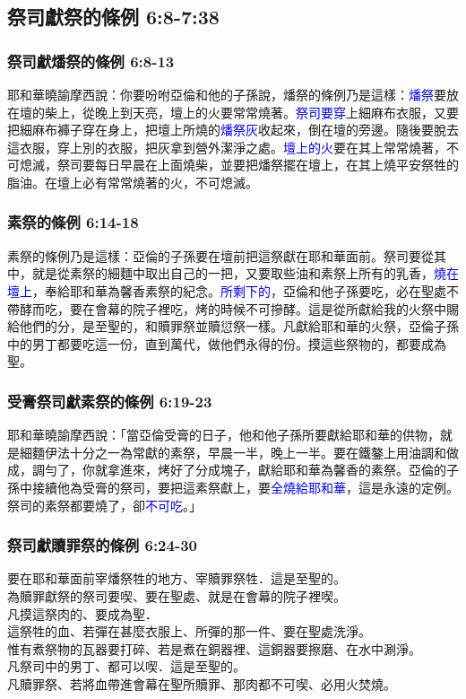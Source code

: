 \subsection{祭司獻祭的條例 6:8-7:38}
\subsubsection{祭司獻燔祭的條例 6:8-13}
\noindent
耶和華曉諭摩西說：你要吩咐亞倫和他的子孫說，燔祭的條例乃是這樣：\textcolor{blue}{燔祭}要放在壇的柴上，從晚上到天亮，壇上的火要常常燒著。\textcolor{blue}{祭司要穿}上細麻布衣服，又要把細麻布褲子穿在身上，把壇上所燒的\textcolor{blue}{燔祭灰}收起來，倒在壇的旁邊。隨後要脫去這衣服，穿上別的衣服，把灰拿到營外潔淨之處。\textcolor{blue}{壇上的火}要在其上常常燒著，不可熄滅，祭司要每日早晨在上面燒柴，並要把燔祭擺在壇上，在其上燒平安祭牲的脂油。在壇上必有常常燒著的火，不可熄滅。

\subsubsection{素祭的條例 6:14-18}
素祭的條例乃是這樣：亞倫的子孫要在壇前把這祭獻在耶和華面前。祭司要從其中，就是從素祭的細麵中取出自己的一把，又要取些油和素祭上所有的乳香，\textcolor{blue}{燒在壇上}，奉給耶和華為馨香素祭的紀念。\textcolor{blue}{所剩下的}，亞倫和他子孫要吃，必在聖處不帶酵而吃，要在會幕的院子裡吃，烤的時候不可摻酵。這是從所獻給我的火祭中賜給他們的分，是至聖的，和贖罪祭並贖愆祭一樣。凡獻給耶和華的火祭，亞倫子孫中的男丁都要吃這一份，直到萬代，做他們永得的份。摸這些祭物的，都要成為聖。

\subsubsection{受膏祭司獻素祭的條例 6:19-23}
耶和華曉諭摩西說：「當亞倫受膏的日子，他和他子孫所要獻給耶和華的供物，就是細麵伊法十分之一為常獻的素祭，早晨一半，晚上一半。要在鐵鏊上用油調和做成，調勻了，你就拿進來，烤好了分成塊子，獻給耶和華為馨香的素祭。亞倫的子孫中接續他為受膏的祭司，要把這素祭獻上，要\textcolor{blue}{全燒給耶和華}，這是永遠的定例。祭司的素祭都要燒了，卻\textcolor{blue}{不可吃}。」

\subsubsection{祭司獻贖罪祭的條例 6:24-30}
\noindent
  要在耶和華面前宰燔祭牲的地方、宰贖罪祭牲．這是至聖的。\\
  為贖罪獻祭的祭司要喫、要在聖處、就是在會幕的院子裡喫。\\
  凡摸這祭肉的、要成為聖．\\
  這祭牲的血、若彈在甚麼衣服上、所彈的那一件、要在聖處洗淨。\\
  惟有煮祭物的瓦器要打碎、若是煮在銅器裡、這銅器要擦磨、在水中涮淨。\\
  凡祭司中的男丁、都可以喫．這是至聖的。\\
  凡贖罪祭、若將血帶進會幕在聖所贖罪、那肉都不可喫、必用火焚燒。\\


